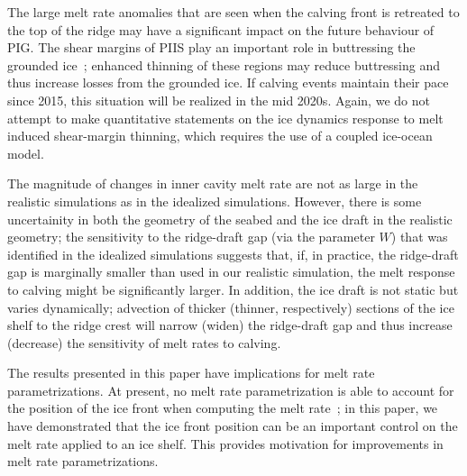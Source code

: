 \documentclass[draft]{agujournal2019}
\begin{document}
The large melt rate anomalies that are seen when the calving front is retreated to the top of the ridge may have a significant impact on the future behaviour of PIG. The shear margins of PIIS play an important role in buttressing the grounded ice~\cite{Lhermitte2020PNAS}; enhanced thinning of these regions may reduce buttressing and thus increase losses from the grounded ice. If calving events maintain their pace since 2015, this situation will be realized in the mid 2020s. Again, we do not attempt to make quantitative statements on the ice dynamics response to melt induced shear-margin thinning, which requires the use of a coupled ice-ocean model.

The magnitude of changes in inner cavity melt rate are not as large in the realistic simulations as in the idealized simulations. However, there is some uncertainity in both the geometry of the seabed and the ice draft in the realistic geometry; the sensitivity to the ridge-draft gap (via the parameter $W$) that was identified in the idealized simulations suggests that, if, in practice, the ridge-draft gap is marginally smaller than used in our realistic simulation, the melt response to calving might be significantly larger. In addition, the ice draft is not static but varies dynamically; advection of thicker (thinner, respectively) sections of the ice shelf to the ridge crest will narrow (widen) the ridge-draft gap and thus increase (decrease) the sensitivity of melt rates to calving.

The results presented in this paper have implications for melt rate parametrizations. At present, no melt rate parametrization is able to account for the position of the ice front when computing the melt rate~\cite{AsayDavis2017CurrClimChRep}; in this paper, we have demonstrated that the ice front position can be an important control on the melt rate applied to an ice shelf. This provides motivation for improvements in melt rate parametrizations. %
\end{document}
